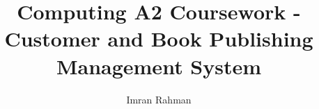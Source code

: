 \documentclass{report}
\begin{document}
\title{Computing A2 Coursework - Customer and Book Publishing Management System}
\author{Imran Rahman}
\maketitle
\tableofcontents






\end{document}
